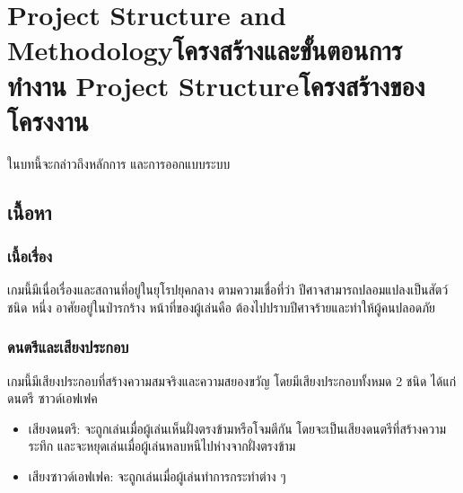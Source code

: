 \chapter{\ifproject%
\ifenglish Project Structure and Methodology\else โครงสร้างและขั้นตอนการทำงาน\fi
\else%
\ifenglish Project Structure\else โครงสร้างของโครงงาน\fi
\fi
}

ในบทนี้จะกล่าวถึงหลักการ และการออกแบบระบบ

\makeatletter


\makeatother

\section{เนื้อหา}

\subsection{เนื้อเรื่อง}

เกมนี้มีเนื่อเรื่องและสถานที่อยู่ในยุโรปยุคกลาง ตามความเชื่อที่ว่า ปีศาจสามารถปลอมแปลงเป็นสัตว์ชนิด
หนึ่ง อาศัยอยู่ในป่ารกร้าง หน้าที่ของผู้เล่นคือ ต้องไปปราบปีศาจร้ายและทําให้ผู้คนปลอดภัย

\subsection{ดนตรีและเสียงประกอบ}

เกมนี้มีเสียงประกอบที่สร้างความสมจริงและความสยองขวัญ โดยมีเสียงประกอบทั้งหมด 2 ชนิด ได้แก่ ดนตรี ซาวด์เอฟเฟค
\begin{itemize}
  \item เสียงดนตรี: จะถูกเล่นเมื่อผู้เล่นเห็นฝั่งตรงข้ามหรือโจมตีกัน โดยจะเป็นเสียงดนตรีที่สร้างความระทึก และจะหยุดเล่นเมื่อผู้เล่นหลบหนีไปห่างจากฝั่งตรงข้าม
  \item เสียงซาวด์เอฟเฟค: จะถูกเล่นเมื่อผู้เล่นทำการกระทำต่าง ๆ
\end{itemize}


